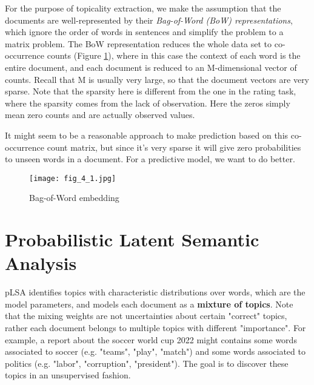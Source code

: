 \documentclass[../book-template.tex]{subfiles}
\begin{document}
\par For the purpose of topicality extraction, we make the assumption that the documents are well-represented by their \emph{Bag-of-Word (BoW) representations}, which ignore the order of words in sentences and simplify the problem to a matrix problem. The BoW representation reduces the whole data set to co-occurrence counts (Figure \ref{fig_4_1}), where in this case the context of each word is the entire document, and each document is reduced to an M-dimensional vector of counts. Recall that M is usually very large, so that the document vectors are very sparse. Note that the sparsity here is different from the one in the rating task, where the sparsity comes from the lack of observation. Here the zeros simply mean zero counts and are actually observed values.
\par It might seem to be a reasonable approach to make prediction based on this co-occurrence count matrix, but since it's very sparse it will give zero probabilities to unseen words in a document. For a predictive model, we want to do better.
\begin{figure}[h] 
	\centering 
	\texttt{[image: fig\_4\_1.jpg]} 
	\caption{Bag-of-Word embedding}\label{fig_4_1}
\end{figure}

\section{Probabilistic Latent Semantic Analysis}
pLSA identifies topics with characteristic distributions over words, which are the model parameters, and models each document as a \textbf{mixture of topics}. Note that the mixing weights are not uncertainties about certain "correct" topics, rather each document belongs to multiple topics with different "importance". For example, a report about the soccer world cup 2022 might contains some words associated to soccer (e.g. "teams", "play", "match") and some words associated to politics (e.g. "labor", "corruption", "president"). The goal is to discover these topics in an unsupervised fashion.
\end{document}
